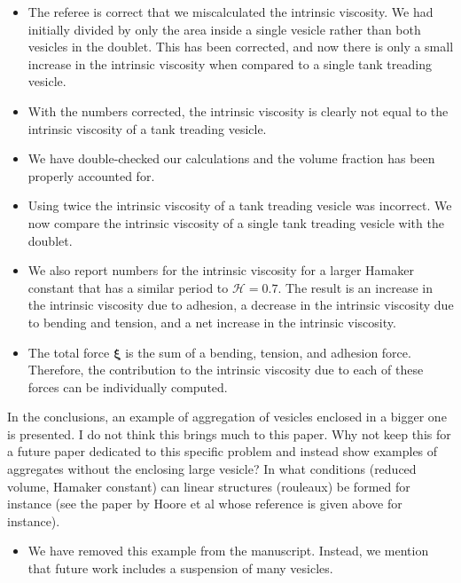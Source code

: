 \documentclass[11pt]{article}
\newcommand{\comment}[1]{{\color{blue} #1}}
\newcommand{\xxi}{\boldsymbol{\xi}}
\begin{document}
\begin{itemize}
  \item The referee is correct that we miscalculated the intrinsic
    viscosity.  We had initially divided by only the area inside a
    single vesicle rather than both vesicles in the doublet.  This has
    been corrected, and now there is only a small increase in the
    intrinsic viscosity when compared to a single tank treading vesicle.

  \item With the numbers corrected, the intrinsic viscosity is clearly
    not equal to the intrinsic viscosity of a tank treading vesicle.

  \item We have double-checked our calculations and the volume fraction
    has been properly accounted for.

  \item Using twice the intrinsic viscosity of a tank treading vesicle
    was incorrect.  We now compare the intrinsic viscosity of a single
    tank treading vesicle with the doublet.

  \item We also report numbers for the intrinsic viscosity for a larger
    Hamaker constant that has a similar period to $\mathcal{H} = 0.7$.
    The result is an increase in the intrinsic viscosity due to
    adhesion, a decrease in the intrinsic viscosity due to bending and
    tension, and a net increase in the intrinsic viscosity.

  \item The total force $\xxi$ is the sum of a bending, tension, and
    adhesion force.  Therefore, the contribution to the intrinsic
    viscosity due to each of these forces can be individually computed.
\end{itemize}

\noindent
\comment{In the conclusions, an example of aggregation of vesicles enclosed
in a bigger one is presented. I do not think this brings much to this
paper. Why not keep this for a future paper dedicated to this specific
problem and instead show examples of aggregates without the enclosing
large vesicle? In what conditions (reduced volume, Hamaker constant)
can linear structures (rouleaux) be formed for instance (see the paper
by Hoore et al whose reference is given above for instance).}
\begin{itemize}
  \item We have removed this example from the manuscript.  Instead, we
    mention that future work includes a suspension of many vesicles.
\end{itemize}
\end{document}
